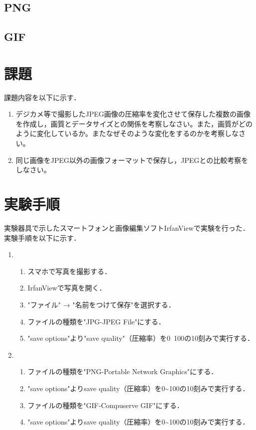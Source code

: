 \documentclass[a4paper,11pt]{bxjsarticle}
\begin{document}
\subsection{PNG}
\subsection{GIF}

\section{課題}
課題内容を以下に示す．
　\begin{enumerate}
    \item デジカメ等で撮影したJPEG画像の圧縮率を変化させて保存した複数の画像を作成し，画質とデータサイズとの関係を考察しなさい。また，画質がどのように変化しているか。またなぜそのような変化をするのかを考察しなさい。
    \item 同じ画像をJPEG以外の画像フォーマットで保存し，JPEGとの比較考察をしなさい。
  \end{enumerate}



\section{実験手順}
実験器具で示したスマートフォンと画像編集ソフトIrfanViewで実験を行った．
実験手順を以下に示す．\\
\begin{enumerate}
  \item \begin{enumerate}
          \item スマホで写真を撮影する．
          \item IrfanViewで写真を開く．
          \item "ファイル" → "名前をつけて保存"を選択する．
          \item ファイルの種類を"JPG-JPEG File"にする．
          \item "save options"より"save quality"（圧縮率）を0~100の10刻みで実行する．
        \end{enumerate}
  \item \begin{enumerate}
          \item ファイルの種類を"PNG-Portable Network Graphics"にする．
          \item "save options"よりsave quality（圧縮率）を0\textasciitilde100の10刻みで実行する．
          \item ファイルの種類を"GIF-Compuserve GIF"にする．
          \item "save options"よりsave quality（圧縮率）を0\textasciitilde100の10刻みで実行する．
        \end{enumerate}
\end{enumerate}
\end{document}
